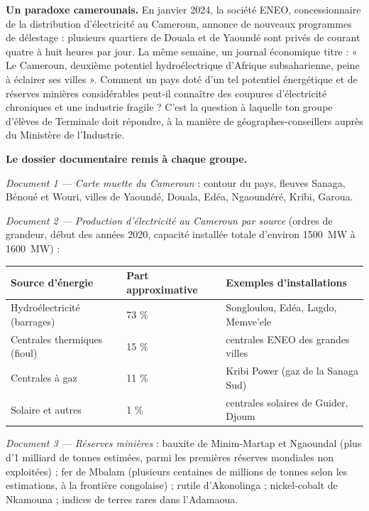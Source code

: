 \documentclass[11pt]{article}
\newcommand{\cle}[1]{{\popxbold\color{popdark}#1}}
\newcounter{popsec}
\newcounter{popsub}
\newcommand{\courssub}[1]{%
  \stepcounter{popsub}%
  \par\vspace{9pt}\noindent{\popxbold\fontsize{11.5}{13}\selectfont\color{popink}{\color{poporange}\thepopsec.\thepopsub}\hspace{6pt}#1}\par\nopagebreak\vspace{4pt}
}
\begin{document}
\courssub{Situation}

\textbf{Un paradoxe camerounais.} En janvier 2024, la société ENEO, concessionnaire de la distribution d'électricité au Cameroun, annonce de nouveaux programmes de \cle{délestage} : plusieurs quartiers de Douala et de Yaoundé sont privés de courant quatre à huit heures par jour. La même semaine, un journal économique titre : « Le Cameroun, deuxième potentiel hydroélectrique d'Afrique subsaharienne, peine à éclairer ses villes ». Comment un pays doté d'un tel potentiel énergétique et de réserves minières considérables peut-il connaître des coupures d'électricité chroniques et une industrie fragile ? C'est la question à laquelle ton groupe d'élèves de Terminale doit répondre, à la manière de géographes-conseillers auprès du Ministère de l'Industrie.

\textbf{Le dossier documentaire remis à chaque groupe.}

\emph{Document 1 — Carte muette du Cameroun} : contour du pays, fleuves Sanaga, Bénoué et Wouri, villes de Yaoundé, Douala, Edéa, Ngaoundéré, Kribi, Garoua.

\emph{Document 2 — Production d'électricité au Cameroun par source} (ordres de grandeur, début des années 2020, capacité installée totale d'environ \SI{1500}{MW} à \SI{1600}{MW}) :

\begin{center}
\begin{tabularx}{\linewidth}{|l|X|X|}\hline
\rowcolor{popblueL} \textbf{Source d'énergie} & \textbf{Part approximative} & \textbf{Exemples d'installations} \\ \hline
Hydroélectricité (barrages) & 73 \% & Songloulou, Edéa, Lagdo, Memve'ele \\ \hline
Centrales thermiques (fioul) & 15 \% & centrales ENEO des grandes villes \\ \hline
Centrales à gaz & 11 \% & Kribi Power (gaz de la Sanaga Sud) \\ \hline
Solaire et autres & 1 \% & centrales solaires de Guider, Djoum \\ \hline
\end{tabularx}
\end{center}

\emph{Document 3 — Réserves minières} : bauxite de Minim-Martap et Ngaoundal (plus d'\num{1} milliard de tonnes estimées, parmi les premières réserves mondiales non exploitées) ; fer de Mbalam (plusieurs centaines de millions de tonnes selon les estimations, à la frontière congolaise) ; rutile d'Akonolinga ; nickel-cobalt de Nkamouna ; indices de terres rares dans l'Adamaoua.
\end{document}
